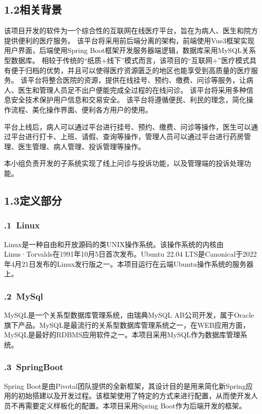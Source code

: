 \documentclass[24pt,a4paper]{article}%
\begin{document}
\subsection*{\songti 1.2相关背景}
该项目开发的软件为一个综合性的互联网在线医疗平台，旨在为病人、医生和院方提供便利的医疗服务。
该平台将采用前后端分离的架构，前端使用Vue3框架实现用户界面，后端使用Spring Boot框架开发服务器端逻辑，数据库采用MySQL关系型数据库。
相较于传统的“纸质+线下”模式而言，该项目的“互联网+”医疗模式具有便于归档的优势，并且可以使得医疗资源匮乏的地区也能享受到高质量的医疗服务。
该平台将整合医院的资源，提供在线挂号、预约、缴费、问诊等服务，让病人、医生和管理人员足不出户便能完成全过程的在线问诊。
该平台将采用多种信息安全技术保护用户信息和交易安全。
该平台将遵循便民、利民的理念，简化操作流程、美化操作界面、便利各方用户的使用。 \par
平台上线后，病人可以通过平台进行挂号、预约、缴费、问诊等操作，医生可以通过平台进行打卡、上班、请假、查询等操作，管理人员可以通过平台进行药房管理、医生管理、病人管理、投诉管理等操作。 \par
本小组负责开发的子系统实现了线上问诊与投诉功能，以及管理端的投诉处理功能。
\newpage
\subsection*{\songti 1.3定义部分}
\subsubsection*{.1\ Linux}
Linux是一种自由和开放源码的类UNIX操作系统。该操作系统的内核由Linus·Torvalds在1991年10月5日首次发布。Ubuntu 22.04 LTS是Canonical于2022年4月21日发布的Linux发行版之一。本项目运行在云端Ubuntu操作系统的服务器上。
\subsubsection*{.2\ MySql}
MySQL是一个关系型数据库管理系统，由瑞典MySQL AB公司开发，属于Oracle旗下产品。MySQL是最流行的关系型数据库管理系统之一，在WEB应用方面，MySQL是最好的RDBMS应用软件之一。本项目采用MySQL作为数据库管理系统。
\subsubsection*{.3\ SpringBoot}
Spring Boot是由Pivotal团队提供的全新框架，其设计目的是用来简化新Spring应用的初始搭建以及开发过程。该框架使用了特定的方式来进行配置，从而使开发人员不再需要定义样板化的配置。本项目采用Spring Boot作为后端开发的框架。
\end{document}
